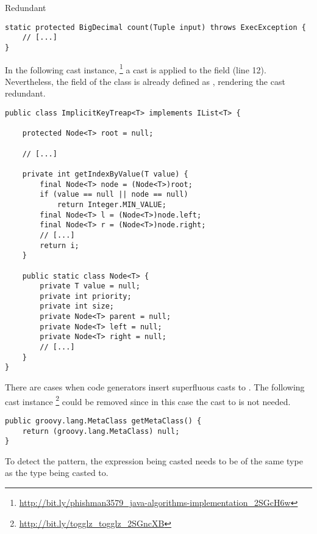 \begin{pattern}{Redundant}
\begin{verbatim}
static protected BigDecimal count(Tuple input) throws ExecException {
    // [...]
}
\end{verbatim}

In the following cast instance,%
\footnote{\url{http://bit.ly/phishman3579_java-algorithms-implementation_2SGcH6w}}
a cast is applied to the  field (line 12).
Nevertheless, the  field of the  class is already defined as ,
rendering the cast redundant.

\begin{verbatim}
public class ImplicitKeyTreap<T> implements IList<T> {

    protected Node<T> root = null;

    // [...]

    private int getIndexByValue(T value) {
        final Node<T> node = (Node<T>)root;
        if (value == null || node == null)
            return Integer.MIN_VALUE;
        final Node<T> l = (Node<T>)node.left;
        final Node<T> r = (Node<T>)node.right;
        // [...]
        return i;
    }

    public static class Node<T> {
        private T value = null;
        private int priority;
        private int size;
        private Node<T> parent = null;
        private Node<T> left = null;
        private Node<T> right = null;
        // [...]
    }
}
\end{verbatim}

There are cases when code generators insert superfluous casts to .
The following cast instance%
\footnote{\url{http://bit.ly/togglz_togglz_2SGncXB}}
could be removed since in this case the cast to  is not needed.

\begin{verbatim}
public groovy.lang.MetaClass getMetaClass() {
    return (groovy.lang.MetaClass) null;
}
\end{verbatim}

\detection{}
%
To detect the \thisp{} pattern, 
the expression being casted needs to be of the same type as the type being casted to.

\discussion{}

\related{}
    
\end{pattern}